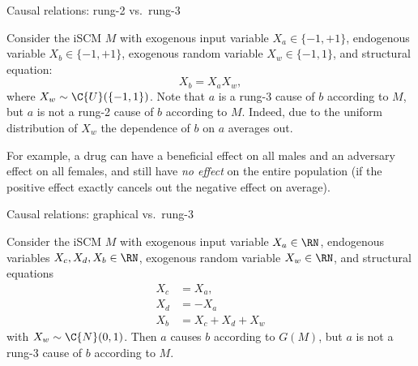 \begin{frame}{Causal relations: rung-2 vs.\ rung-3}
  \begin{Eg}[\ref{eg:scm_cause_of_rung2_vs_rung3}]
  Consider the iSCM $M$ with exogenous input variable $X_a \in \{-1,+1\}$, endogenous variable $X_b \in \{-1,+1\}$, exogenous random variable $X_w \in \{-1,1\}$, and structural equation:
  $$X_b = X_a X_w,$$
  where $X_w \sim \C{U}(\{-1,1\})$.
  Note that $a$ is a rung-3 cause of $b$ according to $M$, but $a$ is not a rung-2 cause of $b$ according to $M$.
  Indeed, due to the uniform distribution of $X_w$ the dependence of $b$ on $a$ averages out.
\end{Eg}
  For example, a drug can have a beneficial effect on all males and an adversary effect on all females, and still have \emph{no effect} on the entire population (if the positive effect exactly cancels out the negative effect on average).
\end{frame}

\begin{frame}{Causal relations: graphical vs.\ rung-3}
  \begin{Eg}[\ref{eg:scm_cause_of_graphical_vs_rung3}]
  Consider the iSCM $M$ with exogenous input variable $X_a \in \RN$, endogenous variables $X_c, X_d, X_b \in \RN$, exogenous random variable $X_w \in \RN$, and structural equations
  \begin{align*}
    X_c &= X_a, \\
    X_d &= -X_a \\
    X_b &= X_c + X_d + X_w 
  \end{align*}
  with $X_w \sim \C{N}(0,1)$.
  Then $a$ causes $b$ according to $G(M)$, but $a$ is not a rung-3 cause of $b$ according to $M$.
\end{Eg}
\end{frame}

